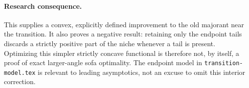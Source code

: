 \documentclass[11pt]{article}
\begin{document}
\paragraph{Research consequence.}
This supplies a convex, explicitly defined improvement to the old majorant near the transition. It also proves a negative result: retaining only the endpoint tails discards a strictly positive part of the niche whenever a tail is present. Optimizing this simpler strictly concave functional is therefore not, by itself, a proof of exact larger-angle sofa optimality. The endpoint model in \texttt{transition-model.tex} is relevant to leading asymptotics, not an excuse to omit this interior correction.
\end{document}
